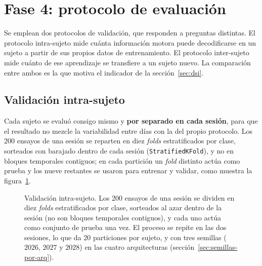 \section{Fase 4: protocolo de evaluación}
\label{sec:fase4}

Se emplean dos protocolos de validación, que responden a preguntas distintas. El
protocolo intra-sujeto mide cuánta información motora puede decodificarse en un
sujeto a partir de sus propios datos de entrenamiento. El protocolo inter-sujeto
mide cuánto de ese aprendizaje se transfiere a un sujeto nuevo. La comparación
entre ambos es la que motiva el indicador de la sección~\ref{sec:dsi}.

\subsection{Validación intra-sujeto}
\label{sec:within}

Cada sujeto se evaluó consigo mismo y \textbf{por separado en cada sesión}, para
que el resultado no mezcle la variabilidad entre días con la del propio
protocolo. Los 200 ensayos de una sesión se reparten en diez \textit{folds} estratificados por
clase, sorteados con barajado dentro de cada sesión (\texttt{StratifiedKFold}), y no en
bloques temporales contiguos; en cada partición un \textit{fold} distinto actúa como prueba y los
nueve restantes se usaron para entrenar y validar, como muestra la
figura~\ref{fig:within}.

\begin{figure}[H]
\centering
{}
\caption{Validación intra-sujeto. Los 200 ensayos de una sesión se dividen en
diez \textit{folds} estratificados por clase, sorteados al azar dentro de la sesión (no son
bloques temporales contiguos), y cada uno actúa como conjunto de prueba una vez. El proceso se
repite en las dos sesiones, lo que da 20 particiones por sujeto, y con tres semillas ($2026$, $2027$ y $2028$) en las
cuatro arquitecturas (sección~\ref{sec:semillas-por-arq}).}
\label{fig:within}
\end{figure}

